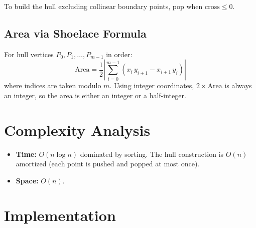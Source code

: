 \documentclass[11pt,a4paper]{article}
\begin{document}
To build the hull excluding collinear boundary points, pop when
$\text{cross} \le 0$.

\subsection{Area via Shoelace Formula}

For hull vertices $P_0, P_1, \ldots, P_{m-1}$ in order:
\[
  \text{Area} = \frac{1}{2} \left| \sum_{i=0}^{m-1}
    (x_i \, y_{i+1} - x_{i+1} \, y_i) \right|
\]
where indices are taken modulo $m$. Using integer coordinates, $2 \times
\text{Area}$ is always an integer, so the area is either an integer or a
half-integer.

\section{Complexity Analysis}

\begin{itemize}
  \item \textbf{Time:} $O(n \log n)$ dominated by sorting. The hull
    construction is $O(n)$ amortized (each point is pushed and popped at
    most once).
  \item \textbf{Space:} $O(n)$.
\end{itemize}

\section{Implementation}
\end{document}
